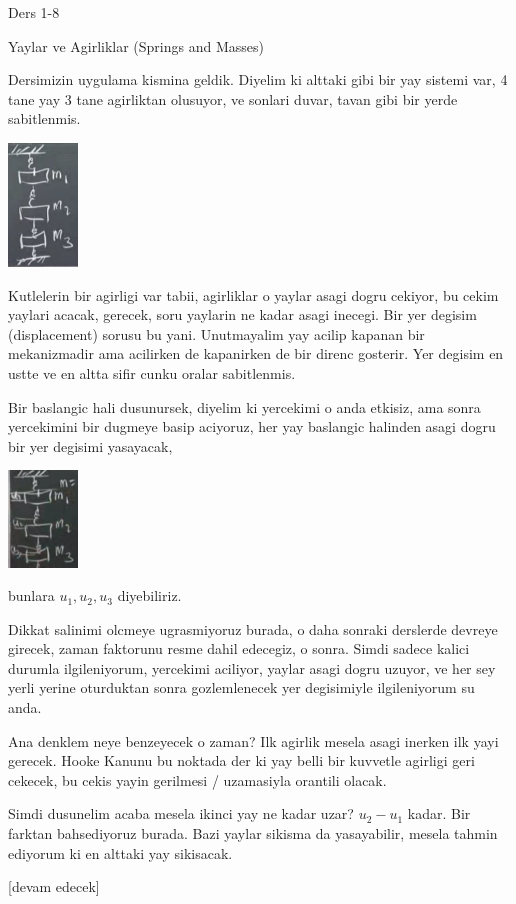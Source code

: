 \documentclass[12pt,fleqn]{article}\usepackage{../../common}
\begin{document}
Ders 1-8

Yaylar ve Agirliklar (Springs and Masses)

Dersimizin uygulama kismina geldik. Diyelim ki alttaki gibi bir yay sistemi var,
4 tane yay 3 tane agirliktan olusuyor, ve sonlari duvar, tavan gibi bir yerde
sabitlenmis.

\includegraphics[width=5em]{compscieng_1_08_01.png}

Kutlelerin bir agirligi var tabii, agirliklar o yaylar asagi dogru cekiyor, bu
cekim yaylari acacak, gerecek, soru yaylarin ne kadar asagi inecegi.  Bir yer
degisim (displacement) sorusu bu yani. Unutmayalim yay acilip kapanan bir
mekanizmadir ama acilirken de kapanirken de bir direnc gosterir. Yer degisim en
ustte ve en altta sifir cunku oralar sabitlenmis.

Bir baslangic hali dusunursek, diyelim ki yercekimi o anda etkisiz, ama sonra
yercekimini bir dugmeye basip aciyoruz, her yay baslangic halinden asagi
dogru bir yer degisimi yasayacak, 

\includegraphics[width=5em]{compscieng_1_08_02.png}

bunlara $u_1,u_2,u_3$ diyebiliriz.

Dikkat salinimi olcmeye ugrasmiyoruz burada, o daha sonraki derslerde devreye
girecek, zaman faktorunu resme dahil edecegiz, o sonra. Simdi sadece kalici
durumla ilgileniyorum, yercekimi aciliyor, yaylar asagi dogru uzuyor, ve her sey
yerli yerine oturduktan sonra gozlemlenecek yer degisimiyle ilgileniyorum su
anda.

Ana denklem neye benzeyecek o zaman? Ilk agirlik mesela asagi inerken ilk yayi
gerecek. Hooke Kanunu bu noktada der ki yay belli bir kuvvetle agirligi geri
cekecek, bu cekis yayin gerilmesi / uzamasiyla orantili olacak.

Simdi dusunelim acaba mesela ikinci yay ne kadar uzar? $u_2-u_1$ kadar. Bir
farktan bahsediyoruz burada. Bazi yaylar sikisma da yasayabilir, mesela
tahmin ediyorum ki en alttaki yay sikisacak. 















[devam edecek]
\end{document}
